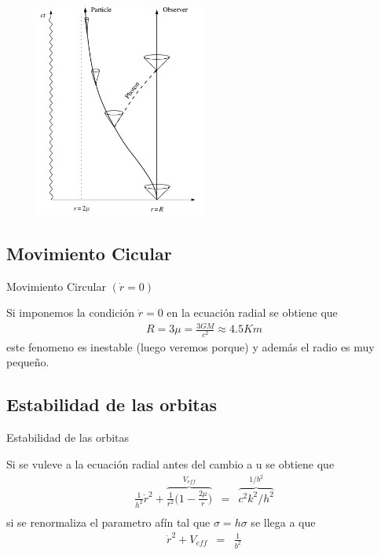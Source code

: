 \documentclass[xcolor=dvipsnames]{beamer}
\begin{document}
    \begin{frame}{}
\begin{figure}
    \centering
    \includegraphics[width=0.5\textwidth]{Presentations/Images/3_foton_radia.png}
\end{figure}
  \end{frame}


\subsection{Movimiento Cicular}
\begin{frame}{Movimiento Circular $(\dot{r}=0)$}
    \begin{block}{}
    Si imponemos la condición  $\dot{r}=0$ en la ecuación radial se obtiene que
    \begin{eqnarray*}
          R=3\mu=\frac{3GM}{c^{2}}\approx 4.5 Km
    \end{eqnarray*}
    este fenomeno es inestable (luego veremos porque) y además el radio es muy pequeño.\\

    \end{block}
\end{frame}


\subsection{Estabilidad de las orbitas}
\begin{frame}{Estabilidad de las orbitas}
    \begin{block}{}
    Si se vuleve a la ecuación radial antes del cambio a u se obtiene que
    \begin{eqnarray*}
      \frac{1}{h^{2}}\dot{r}^{2}+\overbrace{\frac{1}{r^{2}}\Big( 1- \frac{2\mu}{r}\Big)}^{V_{eff}}&=& \overbrace{c^{2}k^{2}/h^{2}}^{1/b^{2}}\\
    \end{eqnarray*}
    si se renormaliza el parametro afín tal que $\sigma=h\sigma$ se llega a que
    \begin{eqnarray*}
      \dot{r}^{2}+V_{eff}&=& \frac{1}{b^{2}}\\
    \end{eqnarray*}
    \end{block}
\end{frame}
\end{document}

